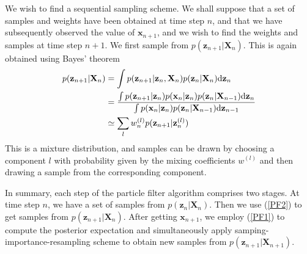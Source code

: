\documentclass[a4paper]{report}
\newcommand{\ud}{\mathrm{d}}
\renewcommand{\bf}{\mathbf}
\begin{document}
We wish to find a sequential sampling scheme. We shall suppose that a set of samples and weights have been obtained at time step $n$, and that we have subsequently observed the value of $\bf{x}_{n+1}$, and we wish to find the weights and samples at time step $n+1$. We first sample from $p(\bf{z}_{n+1}|\bf{X}_n)$. This is again obtained using Bayes' theorem
\begin{align}
	p(\bf{z}_{n+1}|\bf{X}_n) &= \int p(\bf{z}_{n+1}|\bf{z}_n,\bf{X}_n)p(\bf{z}_n|\bf{X}_n)\ud \bf{z}_n \notag\\
	&=\frac{\int p(\bf{z}_{n+1}|\bf{z}_n)p(\bf{x}_n|\bf{z}_n)p(\bf{z}_n|\bf{X}_{n-1})\ud \bf{z}_n}{\int p(\bf{x}_n|\bf{z}_n)p(\bf{z}_n|\bf{X}_{n-1})\ud \bf{z}_{n-1}}\notag\\
	&\simeq \sum_l w_n^{(l)} p(\bf{z}_{n+1}|\bf{z}_n^{(l)}) \label{PF2}
\end{align}
This is a mixture distribution, and samples can be drawn by choosing a component $l$ with probability given by the mixing coefficients $w^{(l)}$ and then drawing a sample from the corresponding component.

In summary, each step of the particle filter algorithm comprises two stages. At time step $n$, we have a set of samples from $p(\bf{z}_n|\bf{X}_n)$. Then we use (\ref{PF2}) to get samples from $p(\bf{z}_{n+1}|\bf{X}_n)$. After getting $\bf{x}_{n+1}$, we employ (\ref{PF1}) to compute the posterior expectation and simultaneously apply samping-importance-resampling scheme to obtain new samples from $p(\bf{z}_{n+1}|\bf{X}_{n+1})$.
\end{document}
